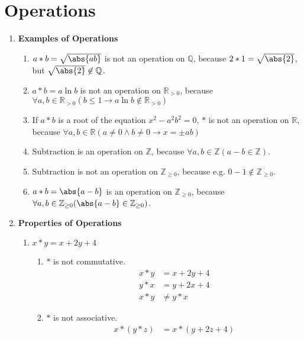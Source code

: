 \setcounter{chapter}{1}
\chapter{Operations}
\label{ch:operations}

\begin{enumerate}[label={\Alph*.},font={\bfseries}]
\item {\bf Examples of Operations}
  \begin{enumerate}[label={\arabic*},font={\bfseries}]
  \item $a * b = \sqrt{\abs{ab}}$ is not an operation on $\mathbb{Q}$, because
    $2 * 1 = \sqrt{\abs{2}}$, but $\sqrt{\abs{2}} \not\in \mathbb{Q}$.
  \item $a * b = a \ln b$ is not an operation on $\mathbb{R}_{>0}$, because
    $\forall a,b\in\mathbb{R}_{>0} (b \le 1 \to a \ln b \not\in \mathbb{R}_{>0})$
  \item If $a * b$ is a root of the equation $x^2 - a^2b^2=0$,
    $*$ is not an operation on $\mathbb{R}$, because
    $\forall a,b \in \mathbb{R} (a \ne 0 \land b \ne 0 \to x = \pm ab)$
  \item Subtraction is an operation on $\mathbb{Z}$, because
    $\forall a,b \in \mathbb{Z} (a-b \in \mathbb{Z})$.
  \item Subtraction is not an operation on $\mathbb{Z}_{\ge 0}$, because
    e.g. $0-1 \not\in \mathbb{Z}_{\ge 0}$.
  \item $a * b = \abs{a-b}$ is an operation on $\mathbb{Z}_{\ge 0}$,
    because $\forall a,b \in \mathbb{Z}_{\ge 0} (\abs{a-b} \in
    \mathbb{Z}_{\ge 0})$.
  \end{enumerate}
\item {\bf Properties of Operations}
  \begin{enumerate}[label={\arabic*},font={\bfseries}]
  \item $x*y=x+2y+4$
    \begin{enumerate}[label={(\roman*)}]
    \item $*$ is not commutative.
      \begin{align*}
        x*y &= x+2y+4 \\
        y*x &= y+2x+4 \\
        x*y &\neq y*x
      \end{align*}
    \item $*$ is not associative.
      \begin{align*}
        x*(y*z) &= x*(y+2z+4) \\

\end{align*}
\end{enumerate}
\end{enumerate}
\end{enumerate}
